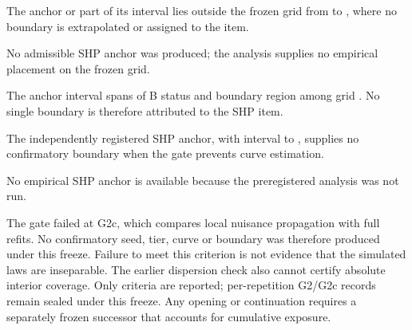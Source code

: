 The anchor or part of its interval lies outside the frozen grid from  to , where no boundary is extrapolated or assigned to the item. %

No admissible SHP anchor was produced; the analysis supplies no empirical placement on the frozen grid. %

The anchor interval spans   of B status and boundary region among  grid . No single boundary is therefore attributed to the SHP item. %

The independently registered SHP anchor,  with interval  to , supplies no confirmatory boundary when the gate prevents curve estimation. %

No empirical SHP anchor is available because the preregistered analysis was not run. %

The gate failed at G2c, which compares local nuisance propagation with full refits. No confirmatory seed, tier, curve or boundary was therefore produced under this freeze. %
Failure to meet this criterion is not evidence that the simulated laws are inseparable. The earlier dispersion check also cannot certify absolute interior coverage. %
Only criteria are reported; per-repetition G2/G2c records remain sealed under this freeze. Any opening or continuation requires a separately frozen successor that accounts for cumulative exposure. %

